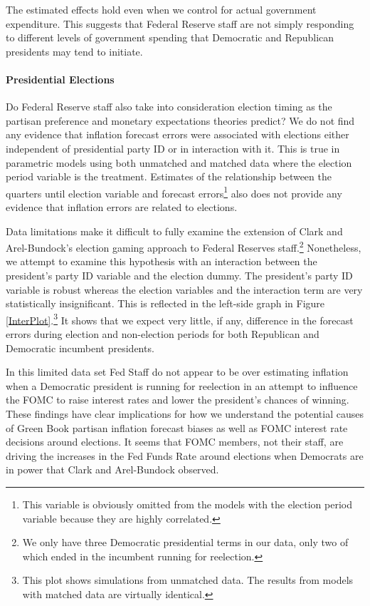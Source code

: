 \documentclass[a4paper]{article}\usepackage{graphicx, color}
\begin{document}
The estimated effects hold even when we control for actual government expenditure. This suggests that Federal Reserve staff are not simply responding to different levels of government spending that Democratic and Republican presidents may tend to initiate.

\paragraph{Presidential Elections}

Do Federal Reserve staff also take into consideration election timing as the partisan preference and monetary expectations theories predict? We do not find any evidence that inflation forecast errors were associated with elections either independent of presidential party ID or in interaction with it. This is true in parametric models using both unmatched and matched data where the election period variable is the treatment. Estimates of the relationship between the quarters until election variable and forecast errors\footnote{This variable is obviously omitted from the models with the election period variable because they are highly correlated.} also does not provide any evidence that inflation errors are related to elections. 

Data limitations make it difficult to fully examine the extension of Clark and Arel-Bundock's \citeyearpar{Clark2011} election gaming approach to Federal Reserves staff.\footnote{We only have three Democratic presidential terms in our data, only two of which ended in the incumbent running for reelection.} Nonetheless, we attempt to examine this hypothesis with an interaction between the president's party ID variable and the election dummy. The president's party ID variable is robust whereas the election variables and the interaction term are very statistically insignificant. This is reflected in the left-side graph in Figure \ref{InterPlot}.\footnote{This plot shows simulations from unmatched data. The results from models with matched data are virtually identical.} It shows that we expect very little, if any, difference in the forecast errors during election and non-election periods for both Republican and Democratic incumbent presidents. 

In this limited data set Fed Staff do not appear to be over estimating inflation when a Democratic president is running for reelection in an attempt to influence the FOMC to raise interest rates and lower the president's chances of winning. These findings have clear implications for how we understand the potential causes of Green Book partisan inflation forecast biases as well as FOMC interest rate decisions around elections. It seems that FOMC members, not their staff, are driving the increases in the Fed Funds Rate around elections when Democrats are in power that Clark and Arel-Bundock observed. 
\end{document}
